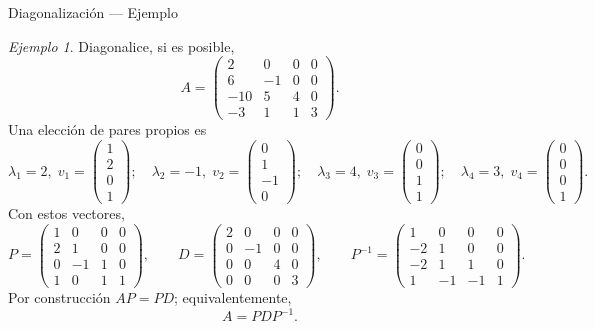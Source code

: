 \documentclass[aspectratio=169,11pt]{beamer}
\theoremstyle{remark}
\newtheorem{Ejem}[definicion]{Ejemplo}
\begin{document}
\begin{frame}[shrink=5]{Diagonalización — Ejemplo}
\footnotesize
\begin{Ejem}


Diagonalice, si es posible,
\[
A=\begin{pmatrix}2 & 0 & 0 & 0\\6 & -1 & 0 & 0\\-10 & 5 & 4 & 0\\-3 & 1 & 1 & 3\end{pmatrix}.
\]
\scriptsize
Una elección de pares propios es
\[
\lambda_1=2,\;v_1=\begin{pmatrix}1\\2\\0\\1\end{pmatrix};\quad \lambda_2=-1,\;v_2=\begin{pmatrix}0\\1\\-1\\0\end{pmatrix};\quad \lambda_3=4,\;v_3=\begin{pmatrix}0\\0\\1\\1\end{pmatrix};\quad \lambda_4=3,\;v_4=\begin{pmatrix}0\\0\\0\\1\end{pmatrix}.
\]
Con estos vectores,
\[
P=\begin{pmatrix}1 & 0 & 0 & 0\\2 & 1 & 0 & 0\\0 & -1 & 1 & 0\\1 & 0 & 1 & 1\end{pmatrix},\qquad D=\begin{pmatrix}2 & 0 & 0 & 0\\0 & -1 & 0 & 0\\0 & 0 & 4 & 0\\0 & 0 & 0 & 3\end{pmatrix},\qquad P^{-1}=\begin{pmatrix}1 & 0 & 0 & 0\\-2 & 1 & 0 & 0\\-2 & 1 & 1 & 0\\1 & -1 & -1 & 1\end{pmatrix}.
\]
Por construcción $AP=PD$; equivalentemente,
\[
\boxed{A=PDP^{-1}}.
\]
\end{Ejem}
\end{frame}
\end{document}
